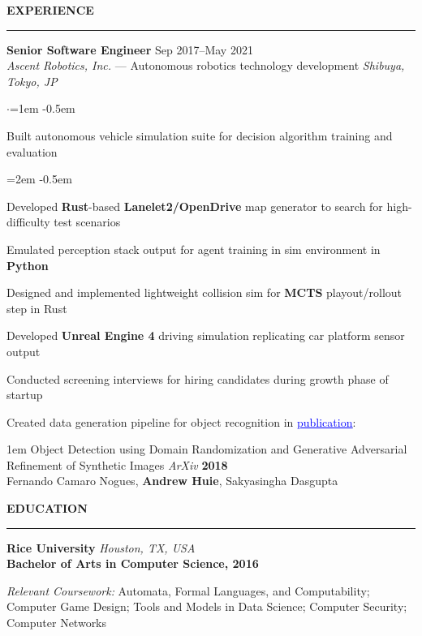 \documentclass[10pt, a4paper]{article}
\newenvironment{aSection}[1]{
    \medskip \textbf{\uppercase{#1}}
    \smallskip
    \hrule
    \begin{list}{}{
            \setlength{\leftmargin}{1.5em}
        }
    \item[]
    }{
    \end{list}
}
\newenvironment{expSubsection}[4]{
    \textbf{#3} \hfill {#2} \\
    {#1} \hfill \textit{#4}
    \smallskip
    \begin{list}{$\cdot$}{\leftmargin=1em}
    \itemsep -0.5em \vspace{-0.5em}
    }{
    \end{list}
    \vspace{0.5em}
}
\newenvironment{subList}{
    \begin{list}{\raisebox{.4ex}{\tiny$\succ$}}{\leftmargin=2em}
    \itemsep -0.5em \vspace{-0.5em}
    }{
    \end{list}
}
\begin{document}
\begin{aSection}{Experience}
    \begin{expSubsection}
        {\textit{Ascent Robotics, Inc.} --- Autonomous robotics technology development}
        {Sep 2017--May 2021}
        {Senior Software Engineer}
        {Shibuya, Tokyo, JP}
    \item Built autonomous vehicle simulation suite for decision algorithm training and evaluation
        \begin{subList}
        \item Developed \textbf{Rust}-based \textbf{Lanelet2/OpenDrive} map generator to search for high-difficulty test
            scenarios
            \item Emulated perception stack output for agent training in sim environment in
                \textbf{Python}
            \item Designed and implemented lightweight collision sim for \textbf{MCTS} playout/rollout step in Rust
            \item Developed \textbf{Unreal Engine 4} driving simulation replicating car platform sensor output
        \end{subList}
    \item Conducted screening interviews for hiring candidates during growth phase of startup
    \item Created data generation pipeline for object recognition in
        \href{https://arxiv.org/abs/1805.11778}{\textcolor{blue}{\underline{publication}}}:
        \begin{adjustwidth}{1em}{}
            \vspace{-0.5em}
            Object Detection using Domain Randomization and Generative Adversarial Refinement
            of Synthetic Images \textit{ArXiv} \textbf{2018}\\
            \hspace*{1em} Fernando Camaro Nogues, \textbf{Andrew Huie}, Sakyasingha Dasgupta
        \end{adjustwidth}
    \end{expSubsection}
\end{aSection}

\begin{aSection}{Education} \textbf{Rice University} \hfill \textit{Houston, TX, USA}\\
    \textbf{Bachelor of Arts in Computer Science, 2016}

    \textit{Relevant Coursework:}
    Automata, Formal Languages, and Computability; Computer Game Design; Tools
    and Models in Data Science; Computer Security; Computer Networks
\end{aSection}
\end{document}
